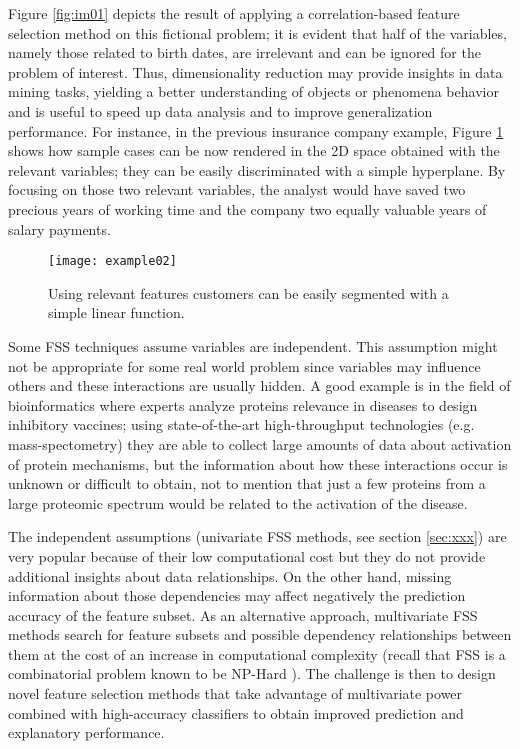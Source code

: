 Figure \ref{fig:im01} depicts the result of applying a correlation-based feature selection method on this fictional problem; it is evident that half of the variables, namely those related to birth dates, are irrelevant and can be ignored for the problem of interest. Thus, dimensionality reduction may provide insights in data mining tasks, yielding a better understanding of objects or phenomena behavior and is useful to speed up data analysis and to improve generalization performance. For instance, in the previous insurance company example, Figure \ref{fig:im08} shows how sample cases can be now rendered in the 2D space obtained with the relevant variables; they can be easily discriminated with a simple hyperplane. By focusing on those two relevant variables, the analyst would have saved two precious years of working time and the company two equally valuable years of salary payments. 

\begin{figure}[h]
	\centering
		\texttt{[image: example02]}
	\caption{Using relevant features customers can be easily segmented with a simple linear function.}
	\label{fig:im08}
\end{figure}

Some FSS techniques assume variables are independent.  This assumption might not be appropriate for some real world problem since variables may influence others and these interactions are usually hidden.  A good example is in the field of bioinformatics where experts analyze proteins relevance in diseases to design inhibitory vaccines; using state-of-the-art high-throughput technologies (e.g. mass-spectometry\cite{lipton08}) they are able to collect large amounts of data about activation of protein mechanisms, but the information about how these interactions occur is unknown or difficult to obtain, not to mention that just a few proteins from a large proteomic spectrum would be related to the activation of the disease. 

The independent assumptions (univariate FSS methods, see section \ref{sec:xxx}) are very popular because of their low computational cost\cite{larranaga08} but they do not provide additional insights about data relationships.  On the other hand, missing information about those dependencies may affect negatively the prediction accuracy of the feature subset.  As an alternative approach, multivariate FSS methods search for feature subsets and possible dependency relationships between them at the cost of an increase in computational complexity (recall that FSS is a combinatorial problem known to be NP-Hard \cite{guyon03,rojas05}). The challenge is then to design novel feature selection methods that take advantage of multivariate power combined with high-accuracy classifiers to obtain improved prediction and explanatory performance.

